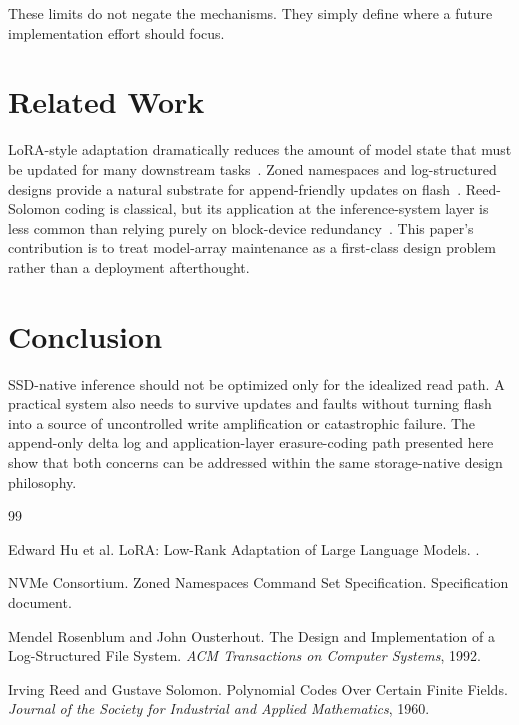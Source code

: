 \documentclass[11pt]{article}
\begin{document}
These limits do not negate the mechanisms. They simply define where a future implementation effort should focus.

\section{Related Work}
LoRA-style adaptation dramatically reduces the amount of model state that must be updated for many downstream tasks~\cite{lora}. Zoned namespaces and log-structured designs provide a natural substrate for append-friendly updates on flash~\cite{zns,lfs}. Reed-Solomon coding is classical, but its application at the inference-system layer is less common than relying purely on block-device redundancy~\cite{rs}. This paper's contribution is to treat model-array maintenance as a first-class design problem rather than a deployment afterthought.

\section{Conclusion}
SSD-native inference should not be optimized only for the idealized read path. A practical system also needs to survive updates and faults without turning flash into a source of uncontrolled write amplification or catastrophic failure. The append-only delta log and application-layer erasure-coding path presented here show that both concerns can be addressed within the same storage-native design philosophy.

\begin{thebibliography}{99}

Edward Hu et al.
\newblock LoRA: Low-Rank Adaptation of Large Language Models.
.

NVMe Consortium.
\newblock Zoned Namespaces Command Set Specification.
\newblock Specification document.

Mendel Rosenblum and John Ousterhout.
\newblock The Design and Implementation of a Log-Structured File System.
\newblock \emph{ACM Transactions on Computer Systems}, 1992.

Irving Reed and Gustave Solomon.
\newblock Polynomial Codes Over Certain Finite Fields.
\newblock \emph{Journal of the Society for Industrial and Applied Mathematics}, 1960.

\end{thebibliography}
\end{document}
